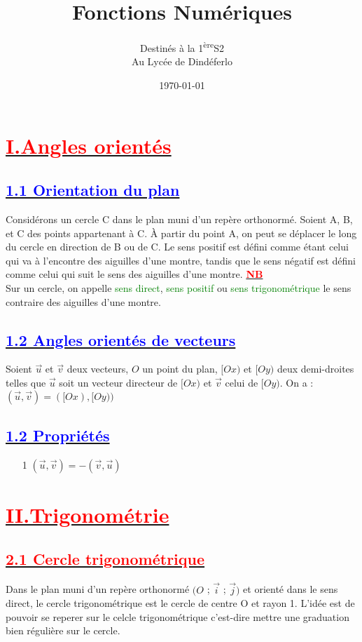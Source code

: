 \documentclass[12pt]{article}
\author{Destinés à la 1\textsuperscript{ère}S2\\Au Lycée de Dindéferlo}
\title{\textbf{Fonctions Numériques}}
\date{\today}
\begin{document}
\maketitle
\newpage

\section*{\underline{\textbf{\textcolor{red}{I.Angles orientés}}}}

\subsection*{\underline{\textbf{\textcolor{blue}{1.1 Orientation du plan}}}}
Considérons un cercle C dans le plan muni d'un repère orthonormé. Soient A, B, et C des points appartenant à C. À partir du point  A, on peut se déplacer le long du cercle en direction de B ou de C.
Le sens positif est défini comme étant celui qui va à l'encontre des aiguilles d'une montre, tandis que le sens négatif est défini comme celui qui suit le sens des aiguilles d'une montre.
\underline{\textbf{\textcolor{red}{NB}}}\\

Sur un cercle, on appelle \textcolor{green}{sens direct}, \textcolor{green}{sens positif} ou \textcolor{green}{sens trigonométrique} le sens contraire des aiguilles d'une montre.
\subsection*{\underline{\textbf{\textcolor{blue}{1.2 Angles orientés de vecteurs}}}}
Soient $\vec{u}$ et $\vec{v}$ deux vecteurs, $O$ un point du plan, $[Ox)$ et $[Oy)$ deux demi-droites telles que $\vec{u}$ soit un vecteur directeur de $[Ox)$ et $\vec{v}$ celui de $[Oy)$.
On a : $(\vec{u}, \vec{v}) = ([Ox),[Oy))$
\subsection*{\underline{\textbf{\textcolor{blue}{1.2 Propriétés}}}}
\begin{itemize}
\item[1] $(\vec{u}, \vec{v})= -(\vec{v}, \vec{u})$
\end{itemize}
\section*{\underline{\textbf{\textcolor{red}{II.Trigonométrie}}}}
\subsection*{\underline{\textbf{\textcolor{red}{2.1 Cercle trigonométrique}}}}
Dans le plan muni d'un repère orthonormé $(O$ ; $\vec{i}$ ; $\vec{j})$ et orienté dans le sens direct, le cercle trigonométrique est le cercle de centre O et rayon 1.
L'idée est de pouvoir se reperer sur le celcle trigonométrique c'est-dire mettre une graduation bien régulière sur le cercle.
\end{document}
